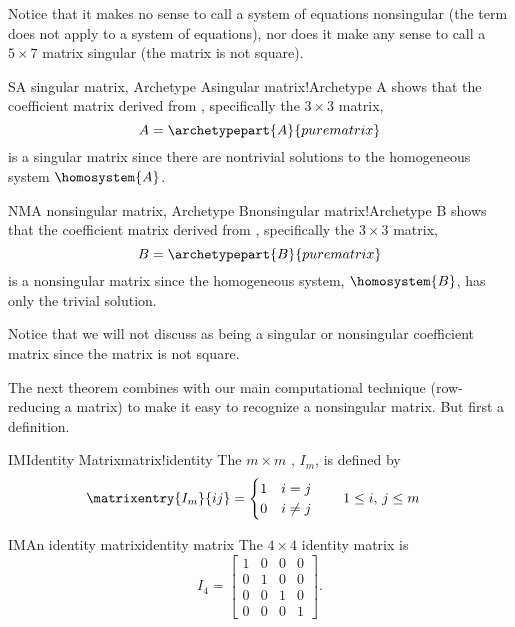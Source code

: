 %
Notice that it makes no sense to call a system of equations nonsingular (the term does not apply to a system of equations), nor does it make any sense to call a $5\times 7$ matrix singular (the matrix is not square).
%
\begin{example}{S}{A singular matrix, Archetype A}{singular matrix!Archetype A}
 shows that the coefficient matrix derived from , specifically the $3\times 3$ matrix,
%
\begin{equation*}
A=\archetypepart{A}{purematrix}
\end{equation*}
%
is a singular matrix since there are nontrivial solutions to the homogeneous system $\homosystem{A}$.
\end{example}
%
\begin{example}{NM}{A nonsingular matrix, Archetype B}{nonsingular matrix!Archetype B}
 shows that the coefficient matrix derived from , specifically the $3\times 3$ matrix,
%
\begin{equation*}
B=\archetypepart{B}{purematrix}
\end{equation*}
%
is a nonsingular matrix since the homogeneous system, $\homosystem{B}$, has only the trivial solution.
\end{example}
%
Notice that we will not discuss  as being a  singular or nonsingular coefficient matrix since the matrix is not square.\par
%
The next theorem combines with our main computational technique (row-reducing a matrix) to make it easy to recognize a nonsingular matrix.  But first a definition.
%
\begin{definition}{IM}{Identity Matrix}{matrix!identity}
The $m\times m$ , $I_m$, is defined by
%
\begin{align*}
\matrixentry{I_m}{ij}&=
\begin{cases}
1 & i=j\\
0 & i\neq j
\end{cases}
\quad\quad
1\leq i,\,j\leq m
\end{align*}
%
%
\end{definition}
%
\begin{example}{IM}{An identity matrix}{identity matrix}
The $4\times 4$ identity matrix is
\begin{equation*}
I_4=
\begin{bmatrix}
1&0&0&0\\
0&1&0&0\\
0&0&1&0\\
0&0&0&1
\end{bmatrix}.
\end{equation*}
\end{example}
